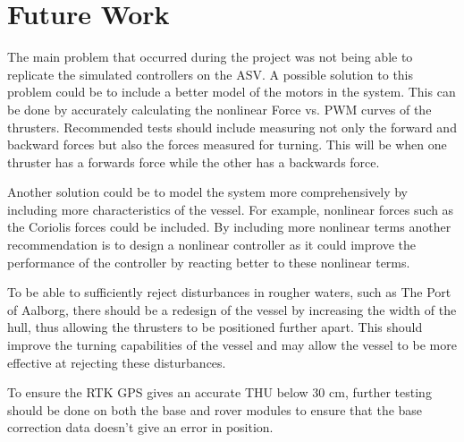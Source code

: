 \chapter{Future Work}

The main problem that occurred during the project was not being able to replicate the simulated controllers on the ASV. A possible solution to this problem could be to include a better model of the motors in the system. This can be done by accurately calculating the nonlinear Force vs. PWM curves of the thrusters. Recommended tests should include measuring not only the forward and backward forces but also the forces measured for turning. This will be when one thruster has a forwards force while the other has a backwards force.

Another solution could be to model the system more comprehensively by including more characteristics of the vessel. For example, nonlinear forces such as the Coriolis forces could be included. By including more nonlinear terms another recommendation is to design a nonlinear controller as it could improve the performance of the controller by reacting better to these nonlinear terms.

To be able to sufficiently reject disturbances in rougher waters, such as The Port of Aalborg, there should be a redesign of the vessel by increasing the width of the hull, thus allowing the thrusters to be positioned further apart. This should improve the turning capabilities of the vessel and may allow the vessel to be more effective at rejecting these disturbances.

To ensure the RTK GPS gives an accurate THU below 30 cm, further testing should be done on both the base and rover modules to ensure that the base correction data doesn't give an error in position.


% 


